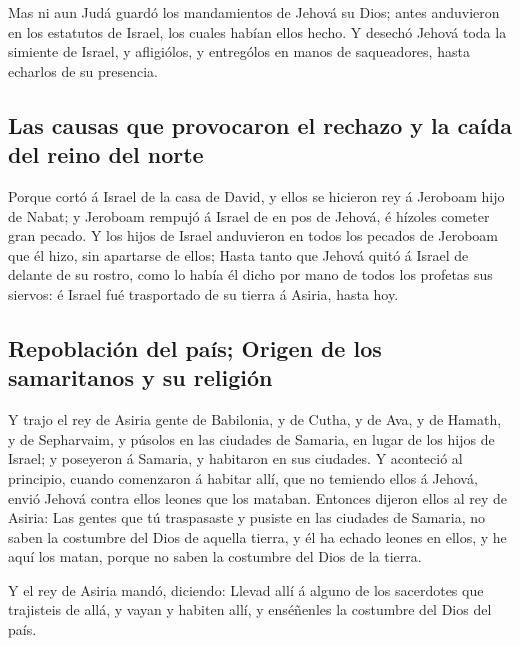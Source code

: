  Mas ni aun Judá guardó los mandamientos de Jehová su Dios;
antes anduvieron en los estatutos de Israel, los cuales habían ellos
hecho.  Y desechó Jehová toda la simiente de Israel, y
afligiólos, y entrególos en manos de saqueadores, hasta echarlos de su
presencia.

\hypertarget{las-causas-que-provocaron-el-rechazo-y-la-cauxedda-del-reino-del-norte}{%
\subsection{Las causas que provocaron el rechazo y la caída del reino
del
norte}\label{las-causas-que-provocaron-el-rechazo-y-la-cauxedda-del-reino-del-norte}}

 Porque cortó á Israel de la casa de David, y ellos se
hicieron rey á Jeroboam hijo de Nabat; y Jeroboam rempujó á Israel de en
pos de Jehová, é hízoles cometer gran pecado.  Y los hijos
de Israel anduvieron en todos los pecados de Jeroboam que él hizo, sin
apartarse de ellos;  Hasta tanto que Jehová quitó á Israel
de delante de su rostro, como lo había él dicho por mano de todos los
profetas sus siervos: é Israel fué trasportado de su tierra á Asiria,
hasta hoy.

\hypertarget{repoblaciuxf3n-del-pauxeds-origen-de-los-samaritanos-y-su-religiuxf3n}{%
\subsection{Repoblación del país; Origen de los samaritanos y su
religión}\label{repoblaciuxf3n-del-pauxeds-origen-de-los-samaritanos-y-su-religiuxf3n}}

 Y trajo el rey de Asiria gente de Babilonia, y de Cutha, y
de Ava, y de Hamath, y de Sepharvaim, y púsolos en las ciudades de
Samaria, en lugar de los hijos de Israel; y poseyeron á Samaria, y
habitaron en sus ciudades.  Y aconteció al principio,
cuando comenzaron á habitar allí, que no temiendo ellos á Jehová, envió
Jehová contra ellos leones que los mataban.  Entonces
dijeron ellos al rey de Asiria: Las gentes que tú traspasaste y pusiste
en las ciudades de Samaria, no saben la costumbre del Dios de aquella
tierra, y él ha echado leones en ellos, y he aquí los matan, porque no
saben la costumbre del Dios de la tierra.

 Y el rey de Asiria mandó, diciendo: Llevad allí á alguno
de los sacerdotes que trajisteis de allá, y vayan y habiten allí, y
enséñenles la costumbre del Dios del país.

